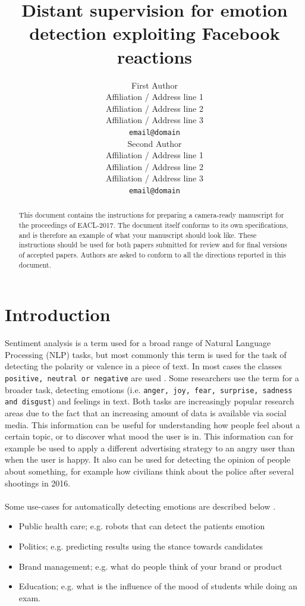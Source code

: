 \documentclass[11pt]{article}
\title{Distant supervision for emotion detection exploiting Facebook reactions}
\author{First Author \\
  Affiliation / Address line 1 \\
  Affiliation / Address line 2 \\
  Affiliation / Address line 3 \\
  {\tt email@domain} \\\And
  Second Author \\
  Affiliation / Address line 1 \\
  Affiliation / Address line 2 \\
  Affiliation / Address line 3 \\
  {\tt email@domain} \\}
\date{}
\begin{document}
\maketitle
\begin{abstract}
  This document contains the instructions for preparing a camera-ready
  manuscript for the proceedings of EACL-2017. The document itself
  conforms to its own specifications, and is therefore an example of
  what your manuscript should look like. These instructions should be
  used for both papers submitted for review and for final versions of
  accepted papers.  Authors are asked to conform to all the directions
  reported in this document.
\end{abstract}

\section{Introduction}
Sentiment analysis is a term used for a broad range of Natural Language Processing (NLP) tasks, but most commonly this term is used for the task of detecting the polarity or valence in a piece of text. In most cases the classes \texttt{positive, neutral or negative} are used \cite{SentimentEmotionSurvey2015}. Some researchers use the term for a broader task, detecting emotions (i.e.  \texttt{anger, joy, fear, surprise, sadness and disgust}) and feelings in text. Both tasks are increasingly popular research areas due to the fact that an increasing amount of data is available via social media. This information can be useful for understanding how people feel about a certain topic, or to discover what mood the user is in. This information can for example be used to apply a different advertising strategy to an angry user than when the user is happy. It also can be used for detecting the opinion of people about something, for example how civilians think about the police after several shootings in 2016.\\\\
Some use-cases for automatically detecting emotions are described below \cite{SentimentEmotionSurvey2015}.
\begin{itemize}
\item Public health care; e.g. robots that can detect the patients emotion
\item Politics; e.g. predicting results using the stance towards candidates
\item Brand management; e.g. what do people think of your brand or product
\item Education; e.g. what is the influence of the mood of students while doing an exam.
\end{itemize}
\end{document}
